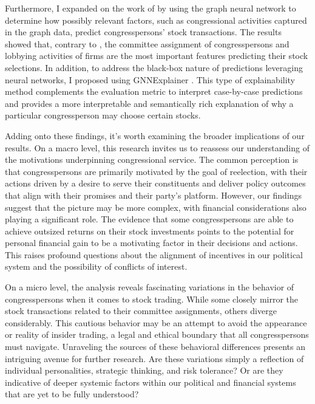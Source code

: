 \documentclass[15pt,letterpaper]{article}
\begin{document}
Furthermore, I expanded on the work of \cite{eg14} by using the graph neural network to determine how possibly relevant factors, such as congressional activities captured in the graph data, predict congresspersons' stock transactions. The results showed that, contrary to \cite{eg14}, the committee assignment of congresspersons and lobbying activities of firms are the most important features predicting their stock selections. In addition, to address the black-box nature of predictions leveraging neural networks, I proposed using GNNExplainer \citep{gex}. This type of explainability method complements the evaluation metric to interpret case-by-case predictions and provides a more interpretable and semantically rich explanation of why a particular congressperson may choose certain stocks.

Adding onto these findings, it's worth examining the broader implications of our results. On a macro level, this research invites us to reassess our understanding of the motivations underpinning congressional service. The common perception is that congresspersons are primarily motivated by the goal of reelection, with their actions driven by a desire to serve their constituents and deliver policy outcomes that align with their promises and their party's platform.
However, our findings suggest that the picture may be more complex, with financial considerations also playing a significant role. The evidence that some congresspersons are able to achieve outsized returns on their stock investments points to the potential for personal financial gain to be a motivating factor in their decisions and actions. This raises profound questions about the alignment of incentives in our political system and the possibility of conflicts of interest.

On a micro level, the analysis reveals fascinating variations in the behavior of congresspersons when it comes to stock trading. While some closely mirror the stock transactions related to their committee assignments, others diverge considerably. This cautious behavior may be an attempt to avoid the appearance or reality of insider trading, a legal and ethical boundary that all congresspersons must navigate.
Unraveling the sources of these behavioral differences presents an intriguing avenue for further research. Are these variations simply a reflection of individual personalities, strategic thinking, and risk tolerance? Or are they indicative of deeper systemic factors within our political and financial systems that are yet to be fully understood?
\end{document}
